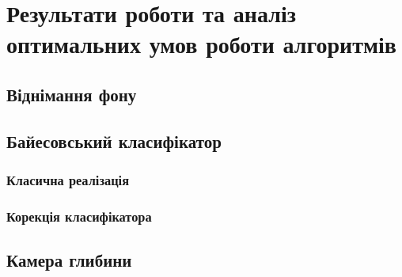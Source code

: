 \section{Результати роботи та аналіз оптимальних умов роботи алгоритмів}
\subsection{Віднімання фону}
\subsection{Байесовський класифікатор}
\subsubsection{Класична реалізація}
\subsubsection{Корекція класифікатора}
\subsection{Камера глибини}